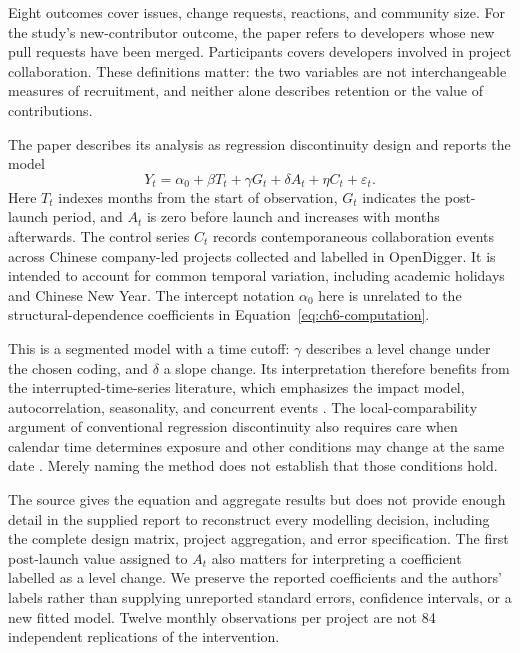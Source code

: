 Eight outcomes cover issues, change requests, reactions, and community size. For the study's new-contributor outcome, the paper refers to developers whose new pull requests have been merged. Participants covers developers involved in project collaboration. These definitions matter: the two variables are not interchangeable measures of recruitment, and neither alone describes retention or the value of contributions.

The paper describes its analysis as regression discontinuity design and reports the model
\begin{equation}
 Y_t=\alpha_0+\beta T_t+\gamma G_t+\delta A_t+\eta C_t+\varepsilon_t.
 \label{eq:ch6-deployment-model}
\end{equation}
Here \(T_t\) indexes months from the start of observation, \(G_t\) indicates the post-launch period, and \(A_t\) is zero before launch and increases with months afterwards. The control series \(C_t\) records contemporaneous collaboration events across Chinese company-led projects collected and labelled in OpenDigger. It is intended to account for common temporal variation, including academic holidays and Chinese New Year. The intercept notation \(\alpha_0\) here is unrelated to the structural-dependence coefficients in Equation~\ref{eq:ch6-computation}.

This is a segmented model with a time cutoff: \(\gamma\) describes a level change under the chosen coding, and \(\delta\) a slope change. Its interpretation therefore benefits from the interrupted-time-series literature, which emphasizes the impact model, autocorrelation, seasonality, and concurrent events \citep{bernal2017}. The local-comparability argument of conventional regression discontinuity also requires care when calendar time determines exposure and other conditions may change at the same date \citep{lee2010}. Merely naming the method does not establish that those conditions hold.

The source gives the equation and aggregate results but does not provide enough detail in the supplied report to reconstruct every modelling decision, including the complete design matrix, project aggregation, and error specification. The first post-launch value assigned to \(A_t\) also matters for interpreting a coefficient labelled as a level change. We preserve the reported coefficients and the authors' labels rather than supplying unreported standard errors, confidence intervals, or a new fitted model. Twelve monthly observations per project are not 84 independent replications of the intervention.


